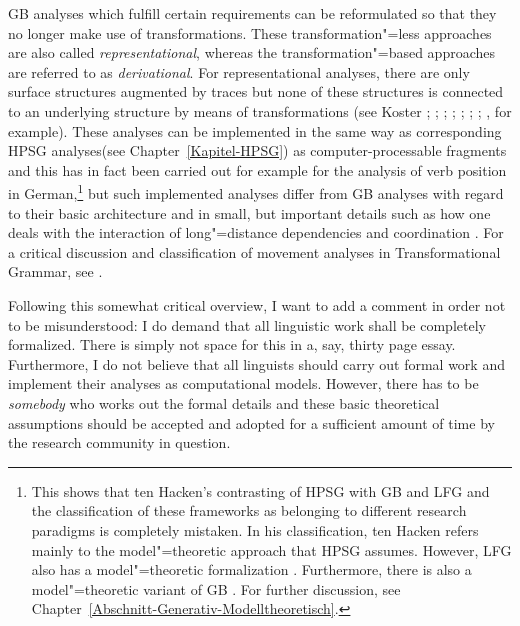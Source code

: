 GB analyses\label{Seite-Representationelle-GB} which fulfill certain requirements can be reformulated so that they no longer make use of transformations.
These transformation"=less approaches are also called \emph{representational}, whereas the transformation"=based approaches are referred to as
\emph{derivational}. For representational analyses, there are only surface structures augmented by traces but none of these structures is connected
to an underlying structure by means of transformations (see %
Koster \citeyear[\page ]{Koster78b-u}; \citeyear[]{Koster87a-u}; 
\citealp{KT91a}; \citealp[Section~1.4]{Haider93a}; 
\citealp[]{Frey93a}; \citealp[--88, 177--178]{Lohnstein93a-u}; \citealp[]{FC94a}; \citealp[]{Veenstra98a}, for example).
These analyses can be implemented in the same way as corresponding HPSG analyses\indexhpsg (see
Chapter~\ref{Kapitel-HPSG}) as computer-processable fragments and this has in fact been carried out
for example for the analysis of verb position in German,\footnote{%
	This shows that ten Hacken's contrasting of HPSG with GB and LFG \citep[Section~4.3]{TenHacken2007a}
        and the classification of these frameworks as belonging to different research paradigms is
        completely mistaken. In his classification, ten Hacken refers mainly to the model"=theoretic
        approach that HPSG assumes. However, LFG also has a model"=theoretic formalization
        \citep{Kaplan95a}. Furthermore, there is also a model"=theoretic variant of GB
	\citep{Rogers98a-u}. For further discussion, see Chapter~\ref{Abschnitt-Generativ-Modelltheoretisch}. 
}
but such implemented analyses differ from GB analyses with regard to their basic architecture and in small, but important details such as how one deals with
the interaction of long"=distance dependencies and coordination \citep{Gazdar81}. For a critical discussion and classification of movement analyses
in Transformational Grammar, see . 

Following this somewhat critical overview, I want to add a comment in order not to be misunderstood:
I do demand that all linguistic work shall be completely formalized. There is simply
not space for this in a, say, thirty page essay. Furthermore, I do not believe that all linguists
should carry out formal work and implement their analyses as computational models. However, there
has to be \emph{somebody} who works out the formal details and these basic theoretical assumptions
should be accepted and adopted for a sufficient amount of time by the research community in
question.



